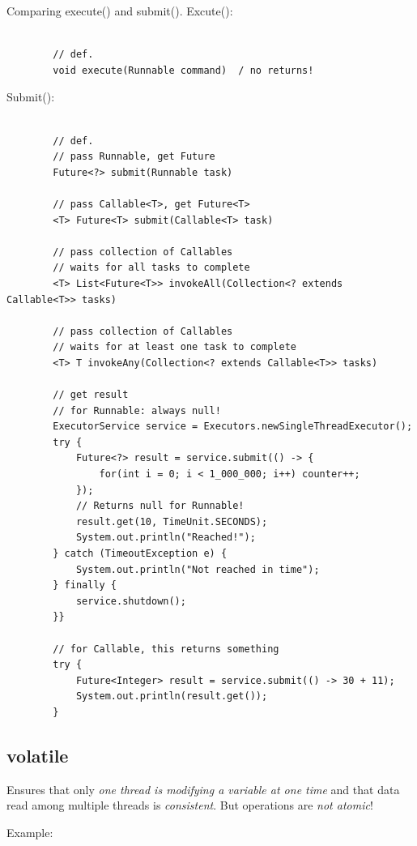 \documentclass{scrartcl}
\begin{document}
    Comparing execute() and submit(). Excute():

    \begin{lstlisting}

        // def.
        void execute(Runnable command)	/ no returns!

    \end{lstlisting}

    Submit():
    \begin{lstlisting}

        // def.
        // pass Runnable, get Future
        Future<?> submit(Runnable task)

        // pass Callable<T>, get Future<T>
        <T> Future<T> submit(Callable<T> task)

        // pass collection of Callables
        // waits for all tasks to complete
        <T> List<Future<T>> invokeAll(Collection<? extends Callable<T>> tasks)

        // pass collection of Callables
        // waits for at least one task to complete
        <T> T invokeAny(Collection<? extends Callable<T>> tasks)

        // get result
        // for Runnable: always null!
        ExecutorService service = Executors.newSingleThreadExecutor();
        try {
            Future<?> result = service.submit(() -> {
                for(int i = 0; i < 1_000_000; i++) counter++;
            });
            // Returns null for Runnable!
            result.get(10, TimeUnit.SECONDS);
            System.out.println("Reached!");
        } catch (TimeoutException e) {
            System.out.println("Not reached in time");
        } finally {
            service.shutdown();
        }}

        // for Callable, this returns something
        try {
            Future<Integer> result = service.submit(() -> 30 + 11);
            System.out.println(result.get());
        }
    \end{lstlisting}

\subsection{volatile}

    Ensures that only \textit{one thread is modifying a variable at one time} and that data read among multiple threads is \textit{consistent}.
    But operations are \textit{not atomic}!

    Example:
\end{document}
